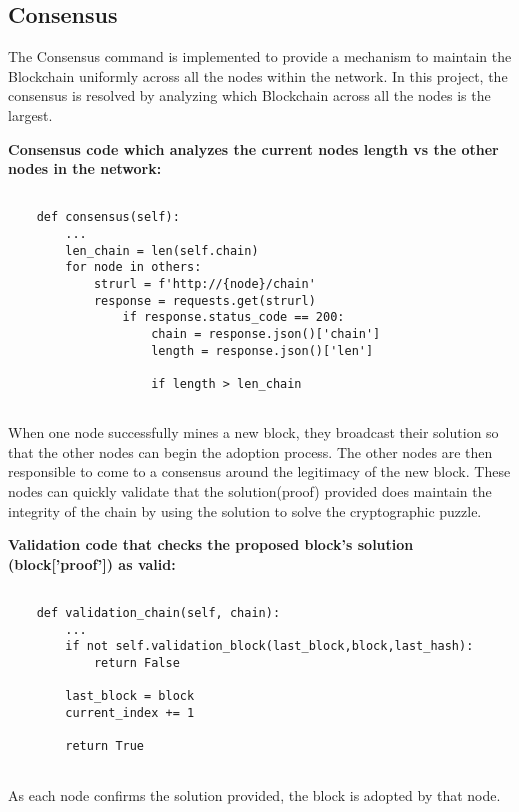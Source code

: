 \subsection{Consensus}

The Consensus command is implemented to provide a mechanism to
maintain the Blockchain uniformly across all the nodes within the
network. In this project, the consensus is resolved by analyzing which
Blockchain across all the nodes is the largest.

\bigskip
\noindent
\textbf{Consensus code which analyzes the current nodes length vs the other nodes in the
network:}
\begin{footnotesize}
\begin{verbatim}

    def consensus(self):
        ...
        len_chain = len(self.chain)
        for node in others:
            strurl = f'http://{node}/chain'
            response = requests.get(strurl)
                if response.status_code == 200:
                	chain = response.json()['chain']
                    length = response.json()['len']

                    if length > len_chain
            
\end{verbatim}
\end{footnotesize}
When one node successfully mines a new block, they broadcast their
solution so that the other nodes can begin the adoption process. The
other nodes are then responsible to come to a consensus around the
legitimacy of the new block. These nodes can quickly validate that the
solution(proof) provided does maintain the integrity of the chain by
using the solution to solve the cryptographic puzzle.

\bigskip
\noindent
\textbf{Validation code that checks the proposed block's solution
(\textbf{block['proof']}) as valid:}
\begin{footnotesize}
\begin{verbatim}

    def validation_chain(self, chain):
        ...
        if not self.validation_block(last_block,block,last_hash):
            return False

        last_block = block
        current_index += 1

        return True
	
\end{verbatim}
\end{footnotesize}
\bigskip
\noindent
As each node confirms the solution provided, the block is adopted by that node.


